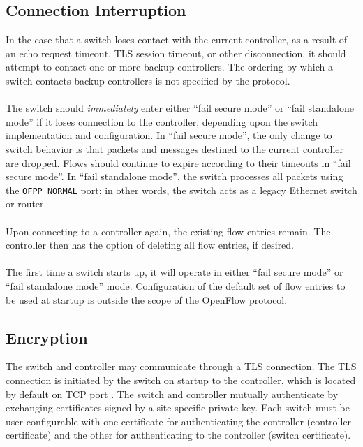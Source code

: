 \documentclass[10pt]{article}
\begin{document}
\subsection{Connection Interruption}
In the case that a switch loses contact with the current controller, as a result of an echo request timeout, TLS session timeout, or other disconnection, it should attempt to contact one or more backup controllers.  The ordering by which a switch contacts backup controllers is not specified by the protocol.
\\\\
The switch should \emph{immediately} enter either ``fail secure mode'' or ``fail standalone mode'' if it loses connection to the controller, depending upon the switch implementation and configuration. In ``fail secure mode'', the only change to switch behavior is that packets and messages destined to the current controller are dropped. Flows should continue to expire according to their timeouts in ``fail secure mode''. In ``fail standalone mode'', the switch processes all packets using the \verb|OFPP_NORMAL| port; in other words, the switch acts as a legacy Ethernet switch or router.
\\\\
Upon connecting to a controller again, the existing flow entries remain.  The controller then has the option of deleting all flow entries, if desired.
\\\\
The first time a switch starts up, it will operate in either ``fail secure mode'' or ``fail standalone mode'' mode.  Configuration of the default set of flow entries to be used at startup is outside the scope of the OpenFlow protocol.

\subsection{Encryption}
The switch and controller may communicate through a TLS connection.  The TLS connection is initiated by the switch on startup to the controller, which is located by default on TCP port .   The switch and controller mutually authenticate by exchanging certificates signed by a site-specific private key.  Each switch must be user-configurable with one certificate for authenticating the controller (controller certificate) and the other for authenticating to the controller (switch certificate).
\end{document}
